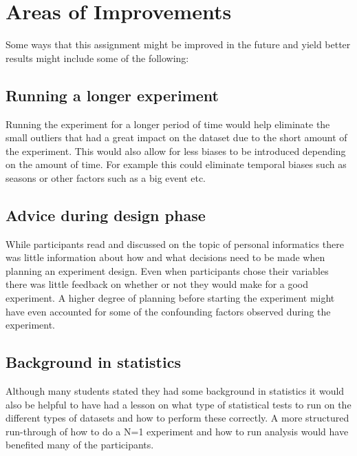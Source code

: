 \section{Areas of Improvements}

Some ways that this assignment might be improved in the future and yield better results might include some of the following:
\subsection{Running a longer experiment}
Running the experiment for a longer period of time would help eliminate the small outliers that had a great impact on the dataset due to the short amount of the experiment. This would also allow for less biases to be introduced depending on the amount of time. For example this could eliminate temporal biases such as seasons or other factors such as a big event etc. 
\subsection{Advice during design phase}
While participants read and discussed on the topic of personal informatics there was
little information about how and what decisions need to be made when planning an experiment design. Even when participants chose their variables there was little feedback on whether or not they would make for a good experiment. A higher degree of planning before starting the experiment might have even accounted for some of the confounding factors observed during the experiment. 
\subsection{Background in statistics}
    Although many students stated they had some background in statistics it would also be helpful to have had a lesson on what type of statistical tests to run on the different types of datasets and how to perform these correctly. A more structured run-through of how to do a N=1 experiment and how to run analysis would have benefited many of the participants. 
